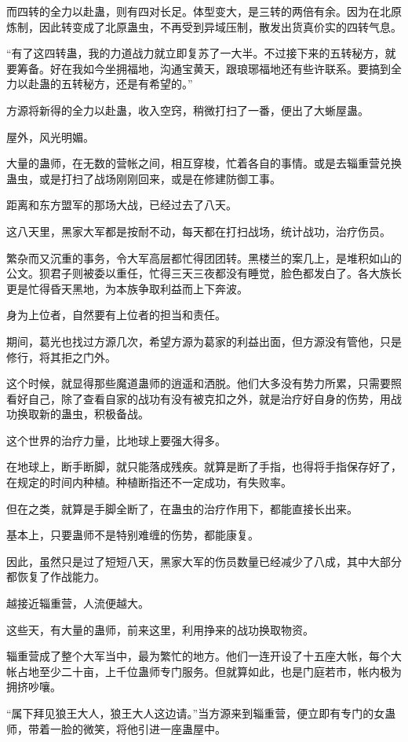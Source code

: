 \begin{this_body}
而四转的全力以赴蛊，则有四对长足。体型变大，是三转的两倍有余。因为在北原炼制，因此转变成了北原蛊虫，不再受到异域压制，散发出货真价实的四转气息。

“有了这四转蛊，我的力道战力就立即复苏了一大半。不过接下来的五转秘方，就要筹备。好在我如今坐拥福地，沟通宝黄天，跟琅琊福地还有些许联系。要搞到全力以赴蛊的五转秘方，还是有希望的。”

方源将新得的全力以赴蛊，收入空窍，稍微打扫了一番，便出了大蜥屋蛊。

屋外，风光明媚。

大量的蛊师，在无数的营帐之间，相互穿梭，忙着各自的事情。或是去辎重营兑换蛊虫，或是打扫了战场刚刚回来，或是在修建防御工事。

距离和东方盟军的那场大战，已经过去了八天。

这八天里，黑家大军都是按耐不动，每天都在打扫战场，统计战功，治疗伤员。

繁杂而又沉重的事务，令大军高层都忙得团团转。黑楼兰的案几上，是堆积如山的公文。狈君子则被委以重任，忙得三天三夜都没有睡觉，脸色都发白了。各大族长更是忙得昏天黑地，为本族争取利益而上下奔波。

身为上位者，自然要有上位者的担当和责任。

期间，葛光也找过方源几次，希望方源为葛家的利益出面，但方源没有管他，只是修行，将其拒之门外。

这个时候，就显得那些魔道蛊师的逍遥和洒脱。他们大多没有势力所累，只需要照看好自己，除了查看自家的战功有没有被克扣之外，就是治疗好自身的伤势，用战功换取新的蛊虫，积极备战。

这个世界的治疗力量，比地球上要强大得多。

在地球上，断手断脚，就只能落成残疾。就算是断了手指，也得将手指保存好了，在规定的时间内种植。种植断指还不一定成功，有失败率。

但在之类，就算是手脚全断了，在蛊虫的治疗作用下，都能直接长出来。

基本上，只要蛊师不是特别难缠的伤势，都能康复。

因此，虽然只是过了短短八天，黑家大军的伤员数量已经减少了八成，其中大部分都恢复了作战能力。

越接近辎重营，人流便越大。

这些天，有大量的蛊师，前来这里，利用挣来的战功换取物资。

辎重营成了整个大军当中，最为繁忙的地方。他们一连开设了十五座大帐，每个大帐占地至少二十亩，上千位蛊师专门服务。但就算如此，也是门庭若市，帐内极为拥挤吵嚷。

“属下拜见狼王大人，狼王大人这边请。”当方源来到辎重营，便立即有专门的女蛊师，带着一脸的微笑，将他引进一座蛊屋中。


\end{this_body}

